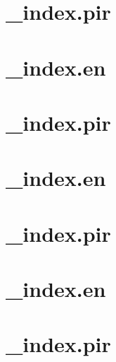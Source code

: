 \let\mypdfximage\pdfximage\def\pdfximage{\immediate\mypdfximage}\documentclass[twoside]{book}
\newcommand{\+}{\discretionary{\mbox{\scriptsize$\hookleftarrow$}}{}{}}
\begin{document}
\chapter{\+\_\+index.\+pir}
\label{md_themes_relearn_exampleSite_content_basics_topbar__index_pir}

\chapter{\+\_\+index.\+en}
\label{md_themes_relearn_exampleSite_content_cont__index_en}

\chapter{\+\_\+index.\+pir}
\label{md_themes_relearn_exampleSite_content_cont__index_pir}

\chapter{\+\_\+index.\+en}
\label{md_themes_relearn_exampleSite_content_cont_archetypes__index_en}

\chapter{\+\_\+index.\+pir}
\label{md_themes_relearn_exampleSite_content_cont_archetypes__index_pir}

\chapter{\+\_\+index.\+en}
\label{md_themes_relearn_exampleSite_content_cont_frontmatter__index_en}

\chapter{\+\_\+index.\+pir}
\label{md_themes_relearn_exampleSite_content_cont_frontmatter__index_pir}

\end{document}
